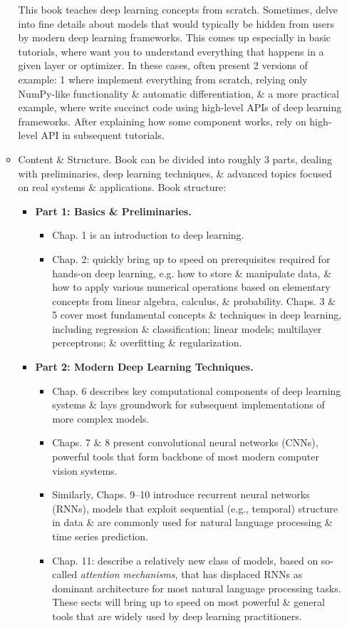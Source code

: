 \documentclass{article}
\begin{document}
\begin{itemize}
\begin{itemize}
		This book teaches deep learning concepts from scratch. Sometimes, delve into fine details about models that would typically be hidden from users by modern deep learning frameworks. This comes up especially in basic tutorials, where want you to understand everything that happens in a given layer or optimizer. In these cases, often present 2 versions of example: 1 where implement everything from scratch, relying only NumPy-like functionality \& automatic differentiation, \& a more practical example, where write succinct code using high-level APIs of deep learning frameworks. After explaining how some component works, rely on high-level API in subsequent tutorials.
		\item {\sf Content \& Structure.} Book can be divided into roughly 3 parts, dealing with preliminaries, deep learning techniques, \& advanced topics focused on real systems \& applications. Book structure:
		\begin{itemize}
			\item {\bf Part 1: Basics \& Preliminaries.}
			\begin{itemize}
				\item Chap. 1 is an introduction to deep learning.
				\item Chap. 2: quickly bring up to speed on prerequisites required for hands-on deep learning, e.g. how to store \& manipulate data, \& how to apply various numerical operations based on elementary concepts from linear algebra, calculus, \& probability. Chaps. 3 \& 5 cover most fundamental concepts \&  techniques in deep learning, including regression \& classification; linear models; multilayer perceptrons; \& overfitting \& regularization.
			\end{itemize}
			\item {\bf Part 2: Modern Deep Learning Techniques.}
			\begin{itemize}
				\item Chap. 6 describes key computational components of deep learning systems \& lays groundwork for subsequent implementations of more complex models.
				\item Chaps. 7 \& 8 present convolutional neural networks (CNNs), powerful tools that form backbone of most modern computer vision systems.
				\item Similarly, Chaps. 9--10 introduce recurrent neural networks (RNNs), models that exploit sequential (e.g., temporal) structure in data \& are commonly used for natural language processing \& time series prediction.
				\item Chap. 11: describe a relatively new class of models, based on so-called {\it attention mechanisms}, that has displaced RNNs as dominant architecture for most natural language processing tasks. These sects will bring up to speed on most powerful \& general tools that are widely used by deep learning practitioners.

\end{itemize}
\end{itemize}
\end{itemize}
\end{itemize}
\end{document}

